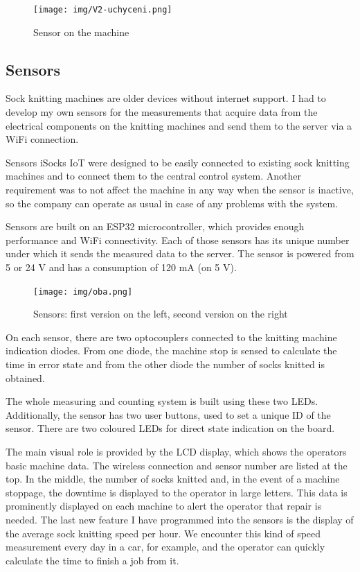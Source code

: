 \documentclass[12pt, a4paper]{article}
\begin{document}
\begin{figure}[t]
    \centering
    \texttt{[image: img/V2-uchyceni.png]}
    \caption{Sensor on the machine}
    \label{fig:SenzorNaStroji}
\end{figure}

\subsection*{Sensors}

Sock knitting machines are older devices without internet support.
I had to develop my own sensors for the measurements that acquire data from the electrical components on the knitting machines and send them to the server via a WiFi connection.

Sensors iSocks IoT were designed to be easily connected to existing sock knitting machines and to connect them to the central control system.
Another requirement was to not affect the machine in any way when the sensor is inactive, so the company can operate as usual in case of any problems with the system.

Sensors are built on an ESP32 microcontroller, which provides enough performance and WiFi connectivity.
Each of those sensors has its unique number under which it sends the measured data to the server.
The sensor is powered from 5 or 24 V and has a consumption of 120 mA (on 5 V).

\begin{figure}[t]
    \centering
    \texttt{[image: img/oba.png]}
    \caption{Sensors: first version on the left, second version on the right}
    \label{fig:dveVerze}
\end{figure}

On each sensor, there are two optocouplers connected to the knitting machine indication diodes.
From one diode, the machine stop is sensed to calculate the time in error state and from the other diode the number of socks knitted is obtained.

The whole measuring and counting system is built using these two LEDs.
Additionally, the sensor has two user buttons, used to set a unique ID of the sensor.
There are two coloured LEDs for direct state indication on the board.

The main visual role is provided by the LCD display, which shows the operators basic machine data.
The wireless connection and sensor number are listed at the top.
In the middle, the number of socks knitted and, in the event of a machine stoppage, the downtime is displayed to the operator in large letters.
This data is prominently displayed on each machine to alert the operator that repair is needed.
The last new feature I have programmed into the sensors is the display of the average sock knitting speed per hour.
We encounter this kind of speed measurement every day in a car, for example, and the operator can quickly calculate the time to finish a job from it.
\end{document}
